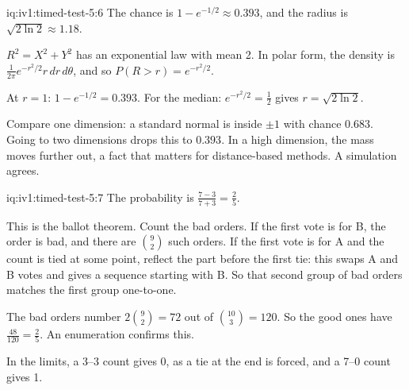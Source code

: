 \begin{solution}{iq:iv1:timed-test-5:6}
The chance is $1 - e^{-1/2} \approx 0.393$, and the radius is $\sqrt{2\ln 2} \approx 1.18$.

$R^2 = X^2 + Y^2$ has an exponential law with mean 2. In polar form, the density is $\frac{1}{2\pi}e^{-r^2/2}r\,dr\,d\theta$, and so $P(R > r) = e^{-r^2/2}$.

At $r = 1$: $1 - e^{-1/2} = 0.393$. For the median: $e^{-r^2/2} = \frac12$ gives $r = \sqrt{2\ln 2}$.

Compare one dimension: a standard normal is inside $\pm 1$ with chance $0.683$. Going to two dimensions drops this to $0.393$. In a high dimension, the mass moves further out, a fact that matters for distance-based methods. A simulation agrees.

\end{solution}

\begin{solution}{iq:iv1:timed-test-5:7}
The probability is $\frac{7 - 3}{7 + 3} = \frac25$.

This is the ballot theorem. Count the bad orders. If the first vote is for B, the order is bad, and there are $\binom92$ such orders. If the first vote is for A and the count is tied at some point, reflect the part before the first tie: this swaps A and B votes and gives a sequence starting with B. So that second group of bad orders matches the first group one-to-one.

The bad orders number $2\binom92 = 72$ out of $\binom{10}{3} = 120$. So the good ones have $\frac{48}{120} = \frac25$. An enumeration confirms this.

In the limits, a 3--3 count gives 0, as a tie at the end is forced, and a 7--0 count gives 1.

\end{solution}

